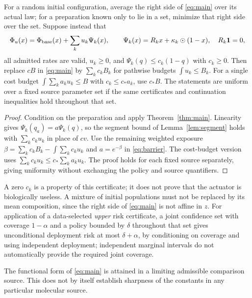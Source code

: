 \begin{corollary}\label{cor:extensions}
For a random initial configuration, average the right side of \eqref{eq:main}
over its actual law; for a preparation known only to lie in a set, minimize that
right side over the set. Suppose instead that
\[
 \Phi_u(x)=\Phi_{\mathrm{base}}(x)+\sum_ku_k\Psi_k(x),\qquad
 \Psi_k(x)=R_kx+\kappa_k\odot(1-x),\quad R_k\mathbf1=0,
\]
all admitted rates are valid, $u_k\ge0$, and $\Psi_k(q)\le c_k(1-q)$ with
$c_k\ge0$. Then replace $cB$ in \eqref{eq:main} by $\sum_kc_kB_k$ for pathwise
budgets $\int u_k\le B_k$. For a single cost budget $\int\sum_ka_ku_k\le B$ with
$c_k\le c_*a_k$, use $c_*B$. The statements are uniform over a fixed source
parameter set if the same certificates and continuation inequalities hold
throughout that set.
\end{corollary}

\begin{proof}
Condition on the preparation and apply Theorem~\ref{thm:main}. Linearity gives
$\Psi_k(q_a)=a\Psi_k(q)$, so the segment bound of Lemma~\ref{lem:segment} holds
with $\sum_kc_ku_k$ in place of $cv$. Use the remaining weighted exposure
$\beta=\sum_kc_kB_k-\int\sum_kc_ku_k$ and $a=e^{-\beta}$ in
\eqref{eq:barrier}. The cost-budget version uses
$\sum_kc_ku_k\le c_*\sum_ka_ku_k$. The proof holds for each fixed source
separately, giving uniformity without exchanging the policy and source
quantifiers.
\end{proof}

A zero $c_k$ is a property of this certificate; it does not prove that the
actuator is biologically useless. A mixture of initial populations must not be
replaced by its mean composition, since the right side of \eqref{eq:main} is not
affine in $z$. For application of a data-selected \emph{upper} risk certificate,
a joint confidence set with coverage $1-\alpha$ and a policy bounded by $\delta$
throughout that set gives unconditional deployment risk at most $\delta+\alpha$,
by conditioning on coverage and using independent deployment; independent
marginal intervals do not automatically provide the required joint coverage.

\begin{proposition}\label{prop:sharp}
The functional form of \eqref{eq:main} is attained in a limiting admissible
comparison source. This does not by itself establish sharpness of the constants
in any particular molecular source.
\end{proposition}

